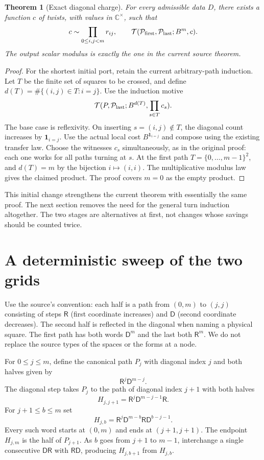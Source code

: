 \documentclass[11pt]{article}
\newtheorem{theorem}{Theorem}[section]
\newcommand{\R}{\mathsf R}
\newcommand{\Dn}{\mathsf D}
\newcommand{\Pth}{\mathcal P}
\newcommand{\Tr}{\mathcal T}
\begin{document}
\begin{theorem}[Exact diagonal charge]\label{thm:charge}
For every admissible data $D$, there exists a function $c$ of twists, with values in $\mathbb C^\times$, such that
\[
 c\sim\prod_{0\le i,j<m}r_{ij},\qquad
 \Tr(\Pth_{\rm first},\Pth_{\rm last};B^m,c).
\]
The output scalar modulus is exactly the one in the current source theorem.
\end{theorem}
\begin{proof}
For the shortest initial port, retain the current arbitrary-path induction. Let $T$ be the finite set of squares to be crossed, and define $d(T)=\#\{(i,j)\in T:i=j\}$. Use the induction motive
\[
 \Tr(P,\Pth_{\rm last};B^{d(T)},\prod_{s\in T}c_s).
\]
The base case is reflexivity. On inserting $s=(i,j)\notin T$, the diagonal count increases by $\mathbf 1_{i=j}$. Use the actual local cost $B^{\mathbf 1_{i=j}}$ and compose using the existing transfer law. Choose the witnesses $c_s$ simultaneously, as in the original proof: each one works for all paths turning at $s$. At the first path $T=\{0,\ldots,m-1\}^2$, and $d(T)=m$ by the bijection $i\mapsto(i,i)$. The multiplicative modulus law gives the claimed product. The proof covers $m=0$ as the empty product.
\end{proof}

This initial change strengthens the current theorem with essentially the same proof. The next section removes the need for the general turn induction altogether. The two stages are alternatives at first, not changes whose savings should be counted twice.

\section{A deterministic sweep of the two grids}\label{sec:sweep}
Use the source's convention: each half is a path from $(0,m)$ to $(j,j)$ consisting of steps $\R$ (first coordinate increases) and $\Dn$ (second coordinate decreases). The second half is reflected in the diagonal when naming a physical square. The first path has both words $\Dn^m$ and the last both $\R^m$. We do not replace the source types of the spaces or the forms at a node.

For $0\le j\le m$, define the canonical path $P_j$ with diagonal index $j$ and both halves given by
\[
 \R^j\Dn^{m-j}.
\]
The diagonal step takes $P_j$ to the path of diagonal index $j+1$ with both halves
\[
 H_{j,j+1}=\R^j\Dn^{m-j-1}\R.
\]
For $j+1\le b\le m$ set
\[
 H_{j,b}=\R^j\Dn^{m-b}\R\Dn^{b-j-1}.
\]
Every such word starts at $(0,m)$ and ends at $(j+1,j+1)$. The endpoint $H_{j,m}$ is the half of $P_{j+1}$. As $b$ goes from $j+1$ to $m-1$, interchange a single consecutive $\Dn\R$ with $\R\Dn$, producing $H_{j,b+1}$ from $H_{j,b}$.
\end{document}
